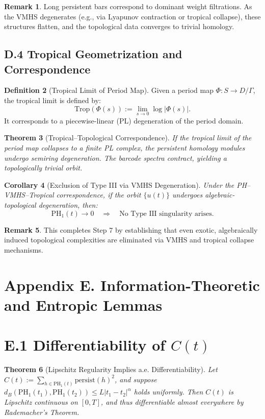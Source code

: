 \documentclass[11pt]{article}
\newtheorem{theorem}{Theorem}[section]
\newtheorem{corollary}[theorem]{Corollary}
\theoremstyle{definition}
\newtheorem{definition}[theorem]{Definition}
\newtheorem{remark}[theorem]{Remark}
\begin{document}
\begin{remark}
Long persistent bars correspond to dominant weight filtrations. As the VMHS degenerates (e.g., via Lyapunov contraction or tropical collapse), these structures flatten, and the topological data converges to trivial homology.
\end{remark}

\subsection*{D.4 Tropical Geometrization and Correspondence}

\begin{definition}[Tropical Limit of Period Map]
Given a period map \( \Phi: S \to D/\Gamma \), the tropical limit is defined by:
\[
\mathrm{Trop}(\Phi(s)) := \lim_{s \to 0} \log |\Phi(s)|.
\]
It corresponds to a piecewise-linear (PL) degeneration of the period domain.
\end{definition}

\begin{theorem}[Tropical–Topological Correspondence]
If the tropical limit of the period map collapses to a finite PL complex, the persistent homology modules undergo semiring degeneration. The barcode spectra contract, yielding a topologically trivial orbit.
\end{theorem}

\begin{corollary}[Exclusion of Type III via VMHS Degeneration]
Under the PH–VMHS–Tropical correspondence, if the orbit \( \{ u(t) \} \) undergoes algebraic-topological degeneration, then:
\[
\mathrm{PH}_1(t) \to 0 \quad \Rightarrow \quad \text{No Type III singularity arises.}
\]
\end{corollary}

\begin{remark}
This completes Step 7 by establishing that even exotic, algebraically induced topological complexities are eliminated via VMHS and tropical collapse mechanisms.
\end{remark}


\section*{Appendix E. Information-Theoretic and Entropic Lemmas}
\label{sec:appendixE}

\section*{E.1 Differentiability of $C(t)$}
\begin{theorem}[Lipschitz Regularity Implies a.e. Differentiability]
Let $C(t) := \sum_{h \in \mathrm{PH}_1(t)} \mathrm{persist}(h)^2$, and suppose $d_B(\mathrm{PH}_1(t_1), \mathrm{PH}_1(t_2)) \leq L |t_1 - t_2|^\alpha$ holds uniformly. Then $C(t)$ is Lipschitz continuous on $[0,T]$, and thus differentiable almost everywhere by Rademacher’s Theorem.
\end{theorem}
\end{document}
